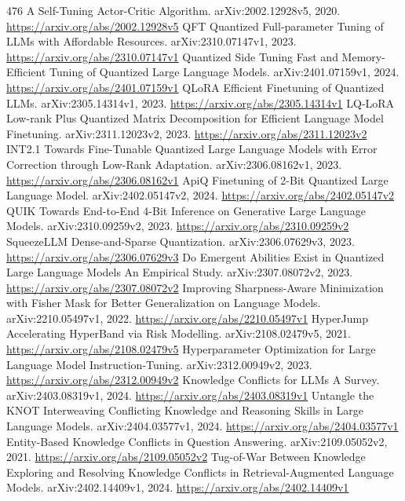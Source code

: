 \documentclass[11pt]{article}
\begin{document}
\begin{thebibliography}{476}
 A Self-Tuning Actor-Critic Algorithm. arXiv:2002.12928v5, 2020. \url{https://arxiv.org/abs/2002.12928v5}
 QFT Quantized Full-parameter Tuning of LLMs with Affordable Resources. arXiv:2310.07147v1, 2023. \url{https://arxiv.org/abs/2310.07147v1}
 Quantized Side Tuning Fast and Memory-Efficient Tuning of Quantized Large Language Models. arXiv:2401.07159v1, 2024. \url{https://arxiv.org/abs/2401.07159v1}
 QLoRA Efficient Finetuning of Quantized LLMs. arXiv:2305.14314v1, 2023. \url{https://arxiv.org/abs/2305.14314v1}
 LQ-LoRA Low-rank Plus Quantized Matrix Decomposition for Efficient Language Model Finetuning. arXiv:2311.12023v2, 2023. \url{https://arxiv.org/abs/2311.12023v2}
 INT2.1 Towards Fine-Tunable Quantized Large Language Models with Error Correction through Low-Rank Adaptation. arXiv:2306.08162v1, 2023. \url{https://arxiv.org/abs/2306.08162v1}
 ApiQ Finetuning of 2-Bit Quantized Large Language Model. arXiv:2402.05147v2, 2024. \url{https://arxiv.org/abs/2402.05147v2}
 QUIK Towards End-to-End 4-Bit Inference on Generative Large Language Models. arXiv:2310.09259v2, 2023. \url{https://arxiv.org/abs/2310.09259v2}
 SqueezeLLM Dense-and-Sparse Quantization. arXiv:2306.07629v3, 2023. \url{https://arxiv.org/abs/2306.07629v3}
 Do Emergent Abilities Exist in Quantized Large Language Models An Empirical Study. arXiv:2307.08072v2, 2023. \url{https://arxiv.org/abs/2307.08072v2}
 Improving Sharpness-Aware Minimization with Fisher Mask for Better Generalization on Language Models. arXiv:2210.05497v1, 2022. \url{https://arxiv.org/abs/2210.05497v1}
 HyperJump Accelerating HyperBand via Risk Modelling. arXiv:2108.02479v5, 2021. \url{https://arxiv.org/abs/2108.02479v5}
 Hyperparameter Optimization for Large Language Model Instruction-Tuning. arXiv:2312.00949v2, 2023. \url{https://arxiv.org/abs/2312.00949v2}
 Knowledge Conflicts for LLMs A Survey. arXiv:2403.08319v1, 2024. \url{https://arxiv.org/abs/2403.08319v1}
 Untangle the KNOT Interweaving Conflicting Knowledge and Reasoning Skills in Large Language Models. arXiv:2404.03577v1, 2024. \url{https://arxiv.org/abs/2404.03577v1}
 Entity-Based Knowledge Conflicts in Question Answering. arXiv:2109.05052v2, 2021. \url{https://arxiv.org/abs/2109.05052v2}
 Tug-of-War Between Knowledge Exploring and Resolving Knowledge Conflicts in Retrieval-Augmented Language Models. arXiv:2402.14409v1, 2024. \url{https://arxiv.org/abs/2402.14409v1}

\end{thebibliography}
\end{document}
